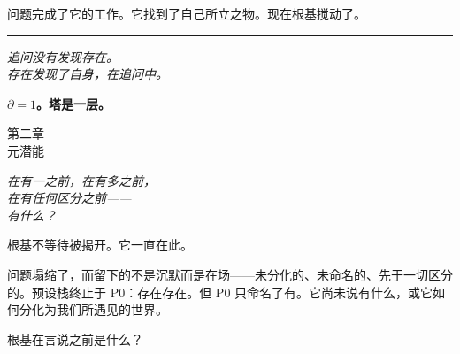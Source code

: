 \documentclass[10pt, openany, oneside]{book}
\renewcommand{\large}{\fontsize{11.5}{14}\selectfont}
\renewcommand{\huge}{\fontsize{17}{21}\selectfont}
\begin{document}
问题完成了它的工作。它找到了自己所立之物。现在根基搅动了。

\vspace{2em}

\begin{center}
    \rule{0.15\textwidth}{0.3pt}
\end{center}

\vspace{0.5em}

\begin{center}
    \itshape
    追问没有发现存在。\\
    存在发现了自身，在追问中。
\end{center}

\vspace{0.5em}

\begin{center}
    \textbf{$\partial = 1$。塔是一层。}
\end{center}


%
%
%

\newpage

\begin{center}
    {\huge\scshape 第二章}\\[0.3em]
    {\large\scshape 元潜能}
\end{center}

\vspace{1.5em}

\begin{center}
    \itshape
    在有一之前，在有多之前，\\
    在有任何区分之前——\\
    有什么？
\end{center}

\vspace{2em}


\noindent 根基不等待被揭开。它一直在此。

问题塌缩了，而留下的不是沉默而是在场——未分化的、未命名的、先于一切区分的。预设栈终止于 P0：存在存在。但 P0 只命名了有。它尚未说有什么，或它如何分化为我们所遇见的世界。

根基在言说之前是什么？
\end{document}
